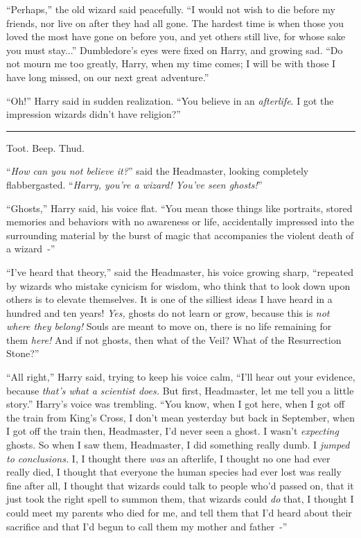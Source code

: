 ``Perhaps,'' the old wizard said peacefully. ``I would not wish to die before my friends, nor live on after they had all gone. The hardest time is when those you loved the most have gone on before you, and yet others still live, for whose sake you must stay...'' Dumbledore's eyes were fixed on Harry, and growing sad. ``Do not mourn me too greatly, Harry, when my time comes; I will be with those I have long missed, on our next great adventure.''

``Oh!'' Harry said in sudden realization. ``You believe in an \emph{afterlife}. I got the impression wizards didn't have religion?''

\begin{center}\rule{3in}{0.4pt}\end{center}

Toot. Beep. Thud.

``\emph{How can you not believe it?}'' said the Headmaster, looking completely flabbergasted. ``\emph{Harry, you're a wizard! You've seen ghosts!}''

``Ghosts,'' Harry said, his voice flat. ``You mean those things like portraits, stored memories and behaviors with no awareness or life, accidentally impressed into the surrounding material by the burst of magic that accompanies the violent death of a wizard~-''

``I've heard that theory,'' said the Headmaster, his voice growing sharp, ``repeated by wizards who mistake cynicism for wisdom, who think that to look down upon others is to elevate themselves. It is one of the silliest ideas I have heard in a hundred and ten years! \emph{Yes,} ghosts do not learn or grow, because this is \emph{not where they belong!} Souls are meant to move on, there is no life remaining for them \emph{here!} And if not ghosts, then what of the Veil? What of the Resurrection Stone?''

``All right,'' Harry said, trying to keep his voice calm, ``I'll hear out your evidence, because \emph{that's what a scientist does.} But first, Headmaster, let me tell you a little story.'' Harry's voice was trembling. ``You know, when I got here, when I got off the train from King's Cross, I don't mean yesterday but back in September, when I got off the train then, Headmaster, I'd never seen a ghost. I wasn't \emph{expecting} ghosts. So when I saw them, Headmaster, I did something really dumb. I \emph{jumped to conclusions.} I, I thought there \emph{was} an afterlife, I thought no one had ever really died, I thought that everyone the human species had ever lost was really fine after all, I thought that wizards could talk to people who'd passed on, that it just took the right spell to summon them, that wizards could \emph{do} that, I thought I could meet my parents who died for me, and tell them that I'd heard about their sacrifice and that I'd begun to call them my mother and father~-''

